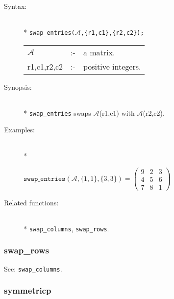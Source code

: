 \begin{description}
\item[Syntax:]\mbox{}\\*
\texttt{swap\_entries($\mathcal{A}$,\{r1,c1\},\{r2,c2\});}\\[2mm]
\begin{tabular}{l l l} 
$\mathcal{A}$  &:-& a matrix. \\
r1,c1,r2,c2 &:-& positive integers.
\end{tabular}

\item[Synopsis:]\mbox{}\\*
\texttt{swap\_entries} swaps $\mathcal{A}$(r1,c1) with 
                $\mathcal{A}$(r2,c2).

\item[Examples:]\mbox{}\\*
\begin{flushleft}  
\begin{math}  
\texttt{swap\_entries}(\mathcal{A},\{1,1\},\{3,3\}) =
        \begin{pmatrix} 9 & 2 & 3 \\ 4 & 5 & 6 \\ 7 & 8 & 1 \end{pmatrix}
\end{math}  
\end{flushleft}

\item[Related functions:]\mbox{}\\*
\texttt{swap\_columns}, \texttt{swap\_rows}.
\end{description}


\subsubsection{swap\_rows}
\label{linalg:swap_rows}
See: \texttt{swap\_columns}.


\subsubsection{symmetricp}
\label{linalg:symmetricp}

